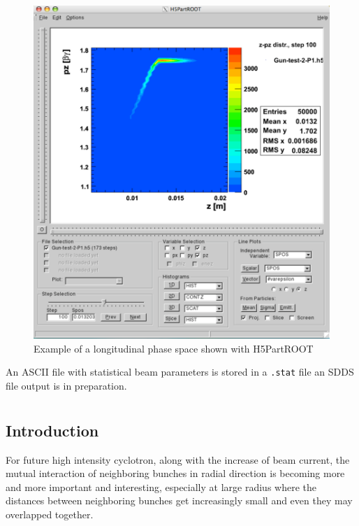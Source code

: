 \begin{figure}[ht]
 \begin{center}
   \includegraphics[width=.9\linewidth,angle=0]{figures/H5rootPicture3}
  \caption{Example of a longitudinal phase space shown with H5PartROOT}
  \label{fig:h5root2}
 \end{center}
\end{figure}



An ASCII file with statistical beam 
parameters is stored in a {\tt .stat} file an SDDS file output is in preparation.

\section{\opalcycl}
\label{sec:opalcycl}

\subsection{Introduction}

For future high intensity cyclotron, along with the increase of beam current, the mutual interaction
of neighboring bunches in radial direction is becoming more and more important and interesting, 
especially at large radius where  
the distances between neighboring bunches get increasingly small and even they may overlapped together.

